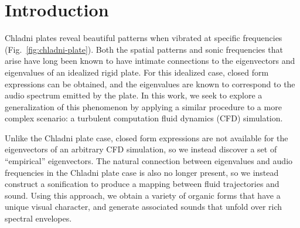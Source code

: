 \documentclass[11pt]{article}
\begin{document}
\section*{Introduction}
Chladni plates reveal beautiful patterns when vibrated at specific frequencies (Fig.~\ref{fig:chladni-plate}). Both the spatial patterns and sonic frequencies that arise have long been known to have intimate connections to the eigenvectors and eigenvalues of an idealized rigid plate. For this idealized case, closed form expressions can be obtained, and the eigenvalues are known to correspond to the audio spectrum emitted by the plate. In this work, we seek to explore a generalization of this phenomenon by applying a similar procedure to a more complex scenario: a turbulent computation fluid dynamics (CFD) simulation.

Unlike the Chladni plate case, closed form expressions are not available for the eigenvectors of an arbitrary CFD simulation, so we instead discover a set of ``empirical'' eigenvectors. The natural connection between eigenvalues and audio frequencies in the Chladni plate case is also no longer present, so we instead construct a sonification to produce a mapping between fluid trajectories and sound. Using this approach, we obtain a variety of organic forms that have a unique visual character, and generate associated sounds that unfold over rich spectral envelopes.


\end{document}
